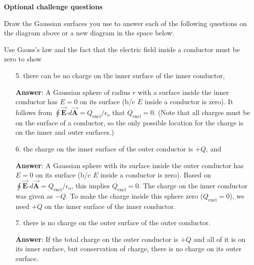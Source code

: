 \documentclass{article}
\newcommand{\bfvec}[1]{\vec{\mathbf{#1}}}
\newcommand{\bfcdot}[0]{\boldsymbol{\cdot}}
\begin{document}
\newpage

\textbf{Optional challenge questions}



Draw the Gaussian surfaces you use to answer each of the following questions on the diagram above or a new diagram in the space below.

Use Gauss's law and the fact that the electric field inside a conductor must be zero to show

\begin{enumerate}

  \item[5.] there can be no charge on the inner surface of the inner conductor,

            \ifsolutions
            \textbf{Answer}: A Gaussian sphere of radius $r$ with a surface inside the inner conductor has $E=0$ on its surface (b/c $E$ inside a conductor is zero). It follows from $\oint \bfvec{E}\bfcdot d\bfvec{A}=Q_{\text{encl}}/\epsilon_o$ that $Q_{\text{encl}}=0$. (Note that all charges must be on the surface of a conductor, so the only possible location for the charge is on the inner and outer surfaces.)
            \else
            \vskip 120pt
            \fi

  \item[6.] the charge on the inner surface of the outer conductor is $+Q$, and

            \ifsolutions
            \textbf{Answer}: A Gaussian sphere with its surface inside the outer conductor has $E=0$ on its surface (b/c $E$ inside a conductor is zero). Based on $\oint \bfvec{E}\bfcdot d\mathbf{\bfvec{A}}=Q_{\text{encl}}/\epsilon_o$, this implies $Q_{\text{encl}}=0$. The charge on the inner conductor was given as $-Q$. To make the charge inside this sphere zero ($Q_{\text{encl}}=0$), we need $+Q$ on the inner surface of the inner conductor.
            \else
            \vskip 120pt
            \fi

  \item[7.] there is no charge on the outer surface of the outer conductor.

            \ifsolutions
            \textbf{Answer}: If the total charge on the outer conductor is $+Q$ and all of it is on its inner surface, but conservation of charge, there is no charge on its outer surface.
            \else

            \newpage
            \fi

\end{enumerate}
\end{document}
